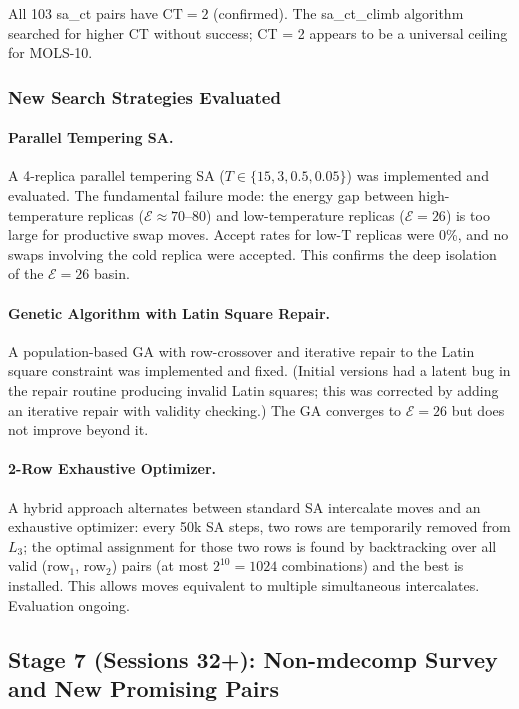 \documentclass[11pt,a4paper]{article}
\theoremstyle{remark}
\newcommand{\CT}{\mathrm{CT}}
\newcommand{\E}{\mathcal{E}}
\begin{document}
All 103 sa\_ct pairs have $\CT = 2$ (confirmed). The sa\_ct\_climb algorithm searched
for higher CT without success; CT = 2 appears to be a universal ceiling for MOLS-10.

\subsubsection{New Search Strategies Evaluated}

\paragraph{Parallel Tempering SA.} A 4-replica parallel tempering SA
($T \in \{15, 3, 0.5, 0.05\}$) was implemented and evaluated. The fundamental failure
mode: the energy gap between high-temperature replicas ($\E \approx 70$--$80$) and
low-temperature replicas ($\E = 26$) is too large for productive swap moves. Accept
rates for low-T replicas were 0\%, and no swaps involving the cold replica were accepted.
This confirms the deep isolation of the $\E=26$ basin.

\paragraph{Genetic Algorithm with Latin Square Repair.} A population-based GA with
row-crossover and iterative repair to the Latin square constraint was implemented and
fixed. (Initial versions had a latent bug in the repair routine producing invalid Latin
squares; this was corrected by adding an iterative repair with validity checking.) The
GA converges to $\E=26$ but does not improve beyond it.

\paragraph{2-Row Exhaustive Optimizer.} A hybrid approach alternates between standard
SA intercalate moves and an exhaustive optimizer: every 50k SA steps, two rows are
temporarily removed from $L_3$; the optimal assignment for those two rows is found by
backtracking over all valid (row$_1$, row$_2$) pairs (at most $2^{10} = 1024$
combinations) and the best is installed. This allows moves equivalent to multiple
simultaneous intercalates. Evaluation ongoing.

\subsection{Stage 7 (Sessions 32+): Non-mdecomp Survey and New Promising Pairs}
\end{document}
